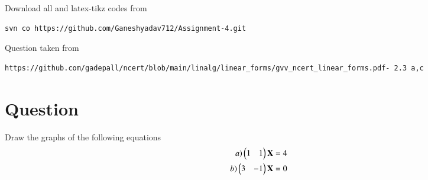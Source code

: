 \documentclass[journal,12pt,twocolumn]{IEEEtran}
\begin{document}
\newpage
\bigskip
\renewcommand{\thefigure}{\theenumi}
\renewcommand{\thetable}{\theenumi}
%
Download all and latex-tikz codes from 
%
\begin{lstlisting}
svn co https://github.com/Ganeshyadav712/Assignment-4.git
\end{lstlisting}
%
Question taken from
\begin{lstlisting}
https://github.com/gadepall/ncert/blob/main/linalg/linear_forms/gvv_ncert_linear_forms.pdf- 2.3 a,c  
\end{lstlisting}
%
\section{Question}
Draw the graphs of the following equations
\begin{align}
  a) \begin{pmatrix}1&1\end{pmatrix}\mathbf{X}=4\\
  b) \begin{pmatrix}3&-1\end{pmatrix}\mathbf{X}=0
\end{align}
\end{document}
